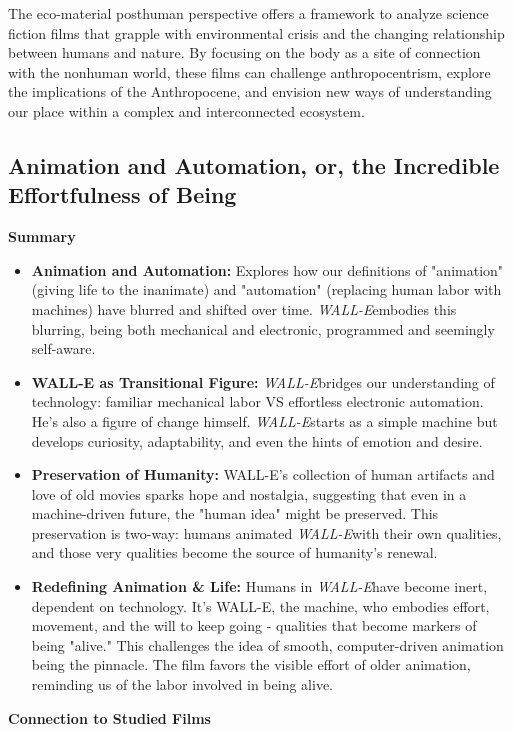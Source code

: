 \documentclass[11pt,fleqn]{book}
\begin{document}
\vspace{5pt}
The eco-material posthuman perspective offers a framework to analyze science fiction films that grapple with environmental crisis and the changing relationship between humans and nature. By focusing on the body as a site of connection with the nonhuman world, these films can challenge anthropocentrism, explore the implications of the Anthropocene, and envision new ways of understanding our place within a complex and interconnected ecosystem.



\subsection{Animation and Automation, or, the Incredible Effortfulness of Being}
\textbf{Summary}

\begin{itemize}
\item \textbf{Animation and Automation:} Explores how our definitions of "animation" (giving life to the inanimate) and "automation" (replacing human labor with machines) have blurred and shifted over time. \textit{WALL-E}embodies this blurring, being both mechanical and electronic, programmed and seemingly self-aware.

\item \textbf{WALL-E as Transitional Figure:} \textit{WALL-E}bridges our understanding of technology: familiar mechanical labor VS effortless electronic automation. He's also a figure of change himself.  \textit{WALL-E}starts as a simple machine but develops curiosity, adaptability, and even the hints of emotion and desire.

\item \textbf{Preservation of Humanity:} WALL-E's collection of human artifacts and love of old movies sparks hope and nostalgia, suggesting that even in a machine-driven future, the "human idea" might be preserved. This preservation is two-way: humans animated \textit{WALL-E}with their own qualities, and those very qualities become the source of humanity's renewal.

\item \textbf{Redefining Animation \& Life:} Humans in \textit{WALL-E}have become inert, dependent on technology. It's WALL-E, the machine, who embodies effort, movement, and the will to keep going - qualities that become markers of being "alive." This challenges the idea of smooth, computer-driven animation being the pinnacle. The film favors the visible effort of older animation, reminding us of the labor involved in being alive. 
\end{itemize}
\vspace{5pt}
\textbf{Connection to Studied Films}
\end{document}
